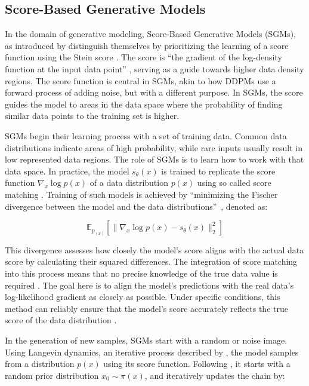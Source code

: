 \subsection{Score-Based Generative Models}\label{SGMs}

In the domain of generative modeling, Score-Based Generative Models (SGMs), as introduced by \citeauthor{song2019SGM} distinguish themselves by prioritizing the learning of a score function using the Stein score \citep{steinScore}. The score is ``the gradient of the log-density function at the input data point'' \citep{song2019SGM}, serving as a guide towards higher data density regions. The score function is central in SGMs, akin to how DDPMs use a forward process of adding noise, but with a different purpose. In SGMs, the score guides the model to areas in the data space where the probability of finding similar data points to the training set is higher.

SGMs begin their learning process with a set of training data. Common data distributions indicate areas of high probability, while rare inputs usually result in low represented data regions. The role of SGMs is to learn how to work with that data space. In practice, the model \(s_\theta(x)\) is trained to replicate the score function \(\nabla_x \log{p(x)}\) of a data distribution \(p(x)\) using so called score matching \citep{hyvarinenScoreMatching}. Training of such models is achieved by ``minimizing the Fischer divergence between the model and the data distributions''~\citeauthor{song2021score}, denoted as: 

\[
\mathbb{E}_{p_{(x)}} \left[ \| \nabla_x \log{p(x)} - s_\theta(x) \| ^2_2 \right]
\] 

This divergence assesses how closely the model's score aligns with the actual data score by calculating their squared differences. The integration of score matching into this process means that no precise knowledge of the true data value is required \citep{song2021score}. The goal here is to align the model's predictions with the real data's log-likelihood gradient as closely as possible. Under specific conditions, this method can reliably ensure that the model's score accurately reflects the true score of the data distribution \citep{song2019SGM}.

In the generation of new samples, SGMs start with a random or noise image. Using Langevin dynamics, an iterative process described by \citep{robertsLangevin}, the model samples from a distribution \( p(x) \) using its score function. Following \citeauthor{song2021score}, it starts with a random prior distribution \( x_0 \sim \pi(x) \), and iteratively updates the chain by:

